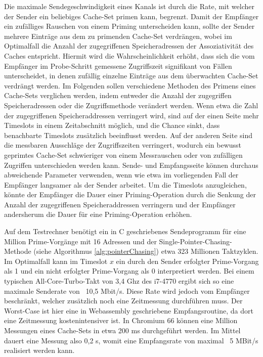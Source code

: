 Die maximale Sendegeschwindigkeit eines Kanals ist durch die Rate, mit welcher der Sender ein beliebiges Cache-Set primen kann, begrenzt.
Damit der Empfänger ein zufälliges Rauschen von einem Priming unterscheiden kann, sollte der Sender mehrere Einträge aus dem zu primenden Cache-Set verdrängen, wobei im Optimalfall die Anzahl der zugegriffenen Speicheradressen der Assoziativität des Caches entspricht.
Hiermit wird die Wahrscheinlichkeit erhöht, dass sich die vom Empfänger im Probe-Schritt gemessene Zugriffszeit signifikant von Fällen unterscheidet, in denen zufällig einzelne Einträge aus dem überwachten Cache-Set verdrängt werden. 
Im Folgenden sollen verschiedene Methoden des Primens eines Cache-Sets verglichen werden, indem entweder die Anzahl der zugegriffen Speicheradressen oder die Zugriffsmethode verändert werden.
Wenn etwa die Zahl der zugegriffenen Speicheraddressen verringert wird, sind auf der einen Seite mehr Timeslots in einem Zeitabschnitt möglich, und die Chance sinkt, dass benachbarte Timeslots zusätzlich beeinflusst werden. Auf der anderen Seite sind die messbaren Ausschläge der Zugriffszeiten verringert, wodurch ein bewusst geprimtes Cache-Set schwieriger von einem Messrauschen oder von zufälligen Zugriffen unterschieden werden kann.
Sende- und Empfangsseite können durchaus abweichende Parameter verwenden, wenn wie etwa im vorliegenden Fall der Empfänger langsamer als der Sender arbeitet. Um die Timeslots anzugleichen, könnte der Empfänger die Dauer einer Priming-Operation durch die Senkung der Anzahl der zugegriffenen Speicheraddressen verringern und der Empfänger andersherum die Dauer für eine Priming-Operation erhöhen. 

Auf dem Testrechner benötigt ein in C geschriebenes Sendeprogramm für eine Million Prime-Vorgänge mit 16 Adressen und der Single-Pointer-Chasing-Methode (siehe Algorithmus \ref{alg:pointerChasing}) etwa 323 Millionen Taktzyklen.
Im Optimalfall kann im Timeslot $x$ ein durch den Sender erfolgter Prime-Vorgang als 1 und ein nicht erfolgter Prime-Vorgang  als 0 interpretiert werden.
Bei einem typischen All-Core-Turbo-Takt von 3,4 Ghz des i7-4770 ergibt sich so eine maximale Senderate von ~10,5 Mbit/s.
Diese Rate wird jedoch vom Empfänger beschränkt, welcher zusätzlich noch eine Zeitmessung durchführen muss. Der Worst-Case ist hier eine in Webassembly geschriebene Empfangsroutine, da dort eine Zeitmessung kostenintensiver ist. In Chromium 66 können eine Million Messungen eines Cache-Sets in etwa 200 ms durchgeführt werden.
Im Mittel dauert eine Messung also 0,2 \textmu s, womit eine Empfangsrate von maximal ~5 MBit/s realisiert werden kann.

